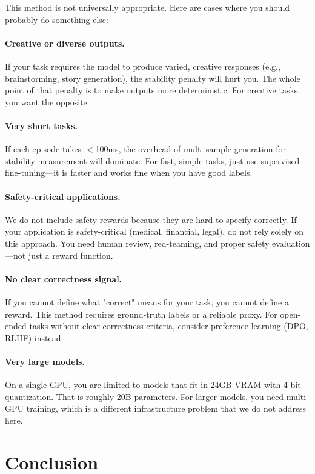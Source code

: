\documentclass[11pt]{article}
\begin{document}
This method is not universally appropriate.
Here are cases where you should probably do something else:

\paragraph{Creative or diverse outputs.}
If your task requires the model to produce varied, creative responses (e.g., brainstorming, story generation), the stability penalty will hurt you.
The whole point of that penalty is to make outputs more deterministic.
For creative tasks, you want the opposite.

\paragraph{Very short tasks.}
If each episode takes $<$100ms, the overhead of multi-sample generation for stability measurement will dominate.
For fast, simple tasks, just use supervised fine-tuning---it is faster and works fine when you have good labels.

\paragraph{Safety-critical applications.}
We do not include safety rewards because they are hard to specify correctly.
If your application is safety-critical (medical, financial, legal), do not rely solely on this approach.
You need human review, red-teaming, and proper safety evaluation---not just a reward function.

\paragraph{No clear correctness signal.}
If you cannot define what "correct" means for your task, you cannot define a reward.
This method requires ground-truth labels or a reliable proxy.
For open-ended tasks without clear correctness criteria, consider preference learning (DPO, RLHF) instead.

\paragraph{Very large models.}
On a single GPU, you are limited to models that fit in 24GB VRAM with 4-bit quantization.
That is roughly 20B parameters.
For larger models, you need multi-GPU training, which is a different infrastructure problem that we do not address here.

\section{Conclusion}
\end{document}
